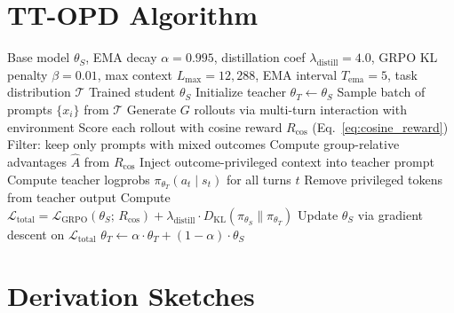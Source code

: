 \documentclass{article}
\begin{document}
\section{TT-OPD Algorithm}
\label{app:algorithm}

\begin{algorithm}[h]
\caption{Turn-Level Truncated On-Policy Distillation (TT-OPD)}
\label{alg:ttopd}
\begin{algorithmic}[1]
\REQUIRE Base model $\theta_S$, EMA decay $\alpha{=}0.995$, distillation coef $\lambda_{\text{distill}}{=}4.0$, GRPO KL penalty $\beta{=}0.01$, max context $L_{\max}{=}12{,}288$, EMA interval $T_{\text{ema}}{=}5$, task distribution $\mathcal{T}$
\ENSURE Trained student $\theta_S$
\STATE Initialize teacher $\theta_T \leftarrow \theta_S$
    \STATE Sample batch of prompts $\{x_i\}$ from $\mathcal{T}$
        \STATE Generate $G$ rollouts via multi-turn interaction with environment
        \STATE Score each rollout with cosine reward $R_{\text{cos}}$ (Eq.~\ref{eq:cosine_reward})
    \ENDFOR
    \STATE Filter: keep only prompts with mixed outcomes 
    \STATE Compute group-relative advantages $\hat{A}$ from $R_{\text{cos}}$
        \STATE Inject outcome-privileged context into teacher prompt
        \STATE Compute teacher logprobs $\pi_{\theta_T}(a_t \mid s_t)$ for all turns $t$
        \STATE Remove privileged tokens from teacher output
    \ENDFOR
    \STATE Compute $\mathcal{L}_{\text{total}} = \mathcal{L}_{\text{GRPO}}(\theta_S;\, R_{\text{cos}}) + \lambda_{\text{distill}} \cdot D_{\text{KL}}(\pi_{\theta_S} \| \pi_{\theta_T})$ 
    \STATE Update $\theta_S$ via gradient descent on $\mathcal{L}_{\text{total}}$
        \STATE $\theta_T \leftarrow \alpha \cdot \theta_T + (1 - \alpha) \cdot \theta_S$ 
    \ENDIF
\ENDFOR
\end{algorithmic}
\end{algorithm}


\section{Derivation Sketches}
\label{app:proofs}
\end{document}

